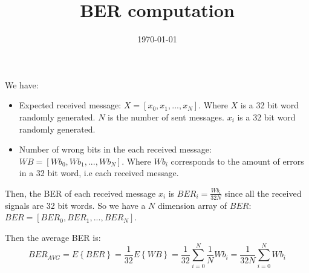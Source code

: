 \documentclass{article}
\title{BER computation}
\date{\today}
\begin{document}
We have:
\begin{itemize}

  \item Expected received message: \(X = [x_{0}, x_{1}, ..., x_{N}]\).
   Where \(X\) is a 32 bit word randomly generated. \(N\) is the number
   of sent messages. \(x_{i}\) is a 32 bit word randomly generated. 
  
  \item Number of wrong bits in the each received message: 
  \(WB = [Wb_{0}, Wb_{1} , ..., Wb_{N}]\). Where \(Wb_{i} \)
  corresponds to the amount of errors in a 32 bit word, i.e each
  received message.

\end{itemize}

Then, the BER of each received message \(x_{i}\) is
\(BER_{i} = \frac{Wb_{i}}{32N}\) since all the received signals are
32 bit words. So we have a \(N\) dimension array of
\(BER\): \(BER = [BER_{0}, BER_{1}, ...,BER_{N}]\).

Then the average BER is:
\[BER_{AVG} = E\left\{BER\right\} = \frac{1}{32}E\left\{WB\right\}=\frac{1}{32}\sum_{i=0}^{N}\frac{1}{N}Wb_{i} = \frac{1}{32N}\sum_{i=0}^{N}Wb_{i}\]
\end{document}
